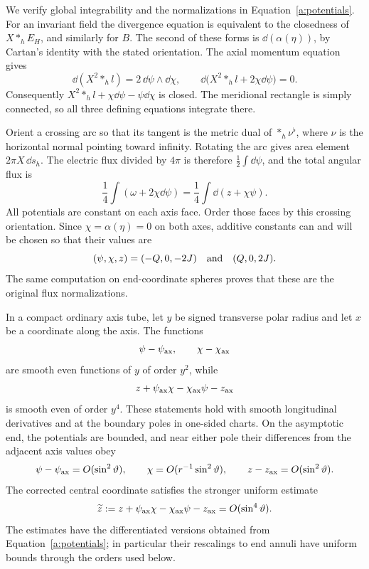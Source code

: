 We verify global integrability and the normalizations in
Equation~\eqref{a:potentials}.  For an invariant field the divergence
equation is equivalent to the closedness of $X*_hE_H$, and similarly
for $B$.  The second of these forms is $\dd(\alpha(\eta))$, by
Cartan's identity with the stated orientation.  The axial momentum
equation gives
\[
 \dd(X^2*_h l)=2\,\dd\psi\wedge\dd\chi,
 \qquad
 \dd\big(X^2*_h l+2\chi\dd\psi\big)=0.
\]
Consequently
$X^2*_h l+\chi\dd\psi-\psi\dd\chi$ is closed.  The
meridional rectangle is simply connected, so all three defining
equations integrate there.

Orient a crossing arc so that its tangent is the metric dual of
$*_h\nu^\flat$, where $\nu$ is the horizontal normal pointing
toward infinity.  Rotating the arc gives area element
$2\pi X\,\dd s_h$.  The electric flux divided by $4\pi$ is
therefore $\frac12\int\dd\psi$, and the total angular flux is
\[
 \frac14\int(\omega+2\chi\dd\psi)
       =\frac14\int\dd(z+\chi\psi).
\]
All potentials are constant on each axis face.  Order those faces
by this crossing orientation.  Since $\chi=\alpha(\eta)=0$ on
both axes, additive constants can and will be chosen so that their
values are
\begin{equation}\label{a:axis-values}
 (\psi,\chi,z)=(-Q,0,-2J)\quad\hbox{and}\quad(Q,0,2J).
\end{equation}
The same computation on end-coordinate spheres proves that these
are the original flux normalizations.

\begin{lemma}\label{a:axis-regularity}
In a compact ordinary axis tube, let $y$ be signed transverse polar
radius and let $x$ be a coordinate along the axis.  The functions
\[
 \psi-\psi_{\rm ax},\qquad\chi-\chi_{\rm ax}
\]
are smooth even functions of $y$ of order $y^2$, while
\[
 z+\psi_{\rm ax}\chi-\chi_{\rm ax}\psi-z_{\rm ax}
\]
is smooth even of order $y^4$.  These statements hold with smooth
longitudinal derivatives and at the boundary poles in one-sided
charts.  On the asymptotic end, the potentials are bounded, and near
either pole their differences from the adjacent axis values obey
\begin{equation}\label{a:end-regularity}
 \psi-\psi_{\rm ax}=O(\sin^2\vartheta),\qquad
 \chi=O(r^{-1}\sin^2\vartheta),\qquad
 z-z_{\rm ax}=O(\sin^2\vartheta).
\end{equation}
The corrected central coordinate satisfies the stronger uniform estimate
\begin{equation}\label{a:end-central}
 \widetilde z:=z+\psi_{\rm ax}\chi-\chi_{\rm ax}\psi-z_{\rm ax}
       =O(\sin^4\vartheta).
\end{equation}
The estimates have the differentiated versions obtained from
Equation~\eqref{a:potentials}; in particular their rescalings to end
annuli have uniform bounds through the orders used below.
\end{lemma}

